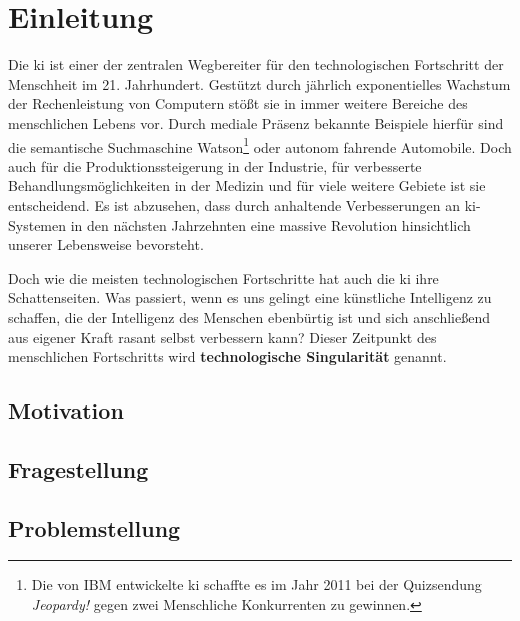 \section{Einleitung}
Die \ac{ki} ist einer der zentralen Wegbereiter für den technologischen Fortschritt der Menschheit im 21. Jahrhundert.
Gestützt durch jährlich exponentielles Wachstum der Rechenleistung von Computern stößt sie in immer weitere Bereiche des menschlichen Lebens vor.
Durch mediale Präsenz bekannte Beispiele hierfür sind die semantische Suchmaschine Watson\footnote{Die von IBM entwickelte \ac{ki} schaffte es im Jahr 2011 bei der Quizsendung \textit{Jeopardy!} gegen zwei Menschliche Konkurrenten zu gewinnen.} oder autonom fahrende Automobile. %
Doch auch für die Produktionssteigerung in der Industrie, für verbesserte Behandlungsmöglichkeiten in der Medizin und für viele weitere Gebiete ist sie entscheidend.
Es ist abzusehen, dass durch anhaltende Verbesserungen an \ac{ki}-Systemen in den nächsten Jahrzehnten eine massive Revolution hinsichtlich unserer Lebensweise bevorsteht.

Doch wie die meisten technologischen Fortschritte hat auch die \ac{ki} ihre Schattenseiten.
Was passiert, wenn es uns gelingt eine künstliche Intelligenz zu schaffen, die der Intelligenz des Menschen ebenbürtig ist und sich anschließend aus eigener Kraft rasant selbst verbessern kann?
Dieser Zeitpunkt des menschlichen Fortschritts wird \textbf{technologische Singularität} genannt.

\subsection{Motivation}




\subsection{Fragestellung}


\subsection{Problemstellung}